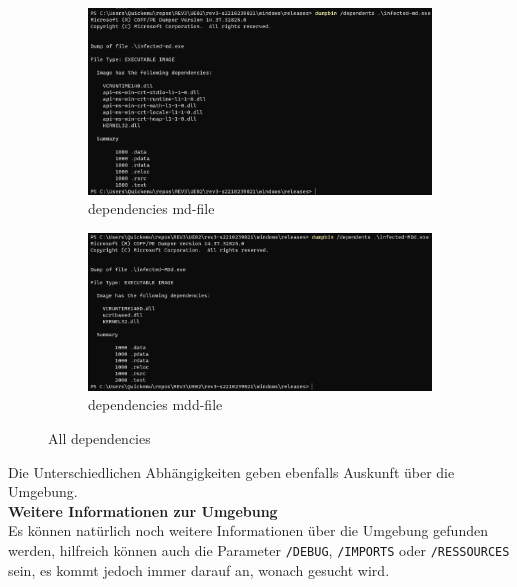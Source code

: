 \documentclass{article}
\begin{document}
\begin{figure}[htp]
		\begin{subfigure}[b]{0.45\textwidth}
			\includegraphics[width=\textwidth]{pictures/1. dependencies-md.png}
			\caption{dependencies md-file}
			\label{fig:image3}
		\end{subfigure}
		\hfill
		\begin{subfigure}[b]{0.45\textwidth}
			\includegraphics[width=\textwidth]{pictures/1. dependencies-mdd.png}
			\caption{dependencies mdd-file}
			\label{fig:image4}
		\end{subfigure}
		\caption{All dependencies}
		\label{fig:grid}
	\end{figure}
	
	Die Unterschiedlichen Abhängigkeiten geben ebenfalls Auskunft über die Umgebung.\\
	
	\noindent \textbf{Weitere Informationen zur Umgebung}\\
	Es können natürlich noch weitere Informationen über die Umgebung gefunden werden, hilfreich können auch die Parameter \texttt{/DEBUG}, \texttt{/IMPORTS} oder \texttt{/RESSOURCES} sein, es kommt jedoch immer darauf an, wonach gesucht wird.\\
	
	
	\pagebreak
	
\end{document}
